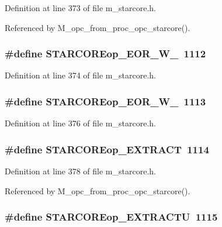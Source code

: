 Definition at line 373 of file m\_\-starcore.h.

Referenced by M\_\-opc\_\-from\_\-proc\_\-opc\_\-starcore().
\subsubsection{\setlength{\rightskip}{0pt plus 5cm}\#define STARCOREop\_\-EOR\_\-W\_~1112}\label{m__starcore_8h_80b447952cbf1be1f19444e619b6ba57}




Definition at line 374 of file m\_\-starcore.h.
\subsubsection{\setlength{\rightskip}{0pt plus 5cm}\#define STARCOREop\_\-EOR\_\-W\_~1113}\label{m__starcore_8h_e43e5e407d1cbdfffae48f76d8d0f892}




Definition at line 376 of file m\_\-starcore.h.
\subsubsection{\setlength{\rightskip}{0pt plus 5cm}\#define STARCOREop\_\-EXTRACT~1114}\label{m__starcore_8h_788bc43fe1d07f60ed145ec087515b0e}




Definition at line 378 of file m\_\-starcore.h.

Referenced by M\_\-opc\_\-from\_\-proc\_\-opc\_\-starcore().
\subsubsection{\setlength{\rightskip}{0pt plus 5cm}\#define STARCOREop\_\-EXTRACTU~1115}\label{m__starcore_8h_1fd948fe319704457cc56a11aeacf85d}




